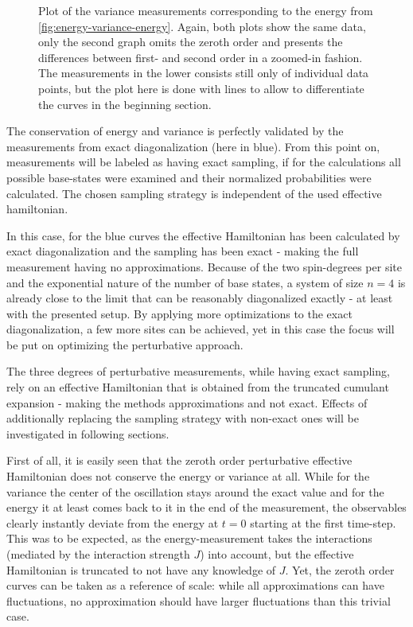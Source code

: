 \begin{figure}[htbp]
    \centering
    \caption{
            Plot of the variance measurements corresponding to the energy from \autoref{fig:energy-variance-energy}.
            Again, both plots show the same data, only the second graph omits the zeroth order and presents the differences between first- and second order in a zoomed-in fashion.
            The measurements in the lower consists still only of individual data points, but the plot here is done with lines to allow to differentiate the curves in the beginning section.
        }
    \label{fig:energy-variance-variance}
\end{figure}

The conservation of energy and variance is perfectly validated by the measurements from exact diagonalization (here in blue).
From this point on, measurements will be labeled as having \glqq exact sampling\grqq, if for the calculations all possible base-states were examined and their normalized probabilities were calculated.
The chosen sampling strategy is independent of the used effective hamiltonian. 

In this case, for the blue curves the effective Hamiltonian has been calculated by exact diagonalization and the sampling has been exact - making the full measurement having no approximations.
Because of the two spin-degrees per site and the exponential nature of the number of base states, a system of size $n=4$ is already close to the limit that can be reasonably diagonalized exactly - at least with the presented setup.
By applying more optimizations to the exact diagonalization, a few more sites can be achieved, yet in this case the focus will be put on optimizing the perturbative approach.

The three degrees of perturbative measurements, while having exact sampling, rely on an effective Hamiltonian that is obtained from the truncated cumulant expansion - making the methods approximations and not exact.
Effects of additionally replacing the sampling strategy with non-exact ones will be investigated in following sections.

First of all, it is easily seen that the zeroth order perturbative effective Hamiltonian does not conserve the energy or variance at all.
While for the variance the center of the oscillation stays around the exact value and for the energy it at least comes back to it in the end of the measurement, the observables clearly instantly deviate from the energy at $t=0$ starting at the first time-step.
This was to be expected, as the energy-measurement takes the interactions (mediated by the interaction strength $J$) into account, but the effective Hamiltonian is truncated to not have any knowledge of $J$.
Yet, the zeroth order curves can be taken as a reference of scale: while all approximations can have fluctuations, no approximation should have larger fluctuations than this trivial case.

